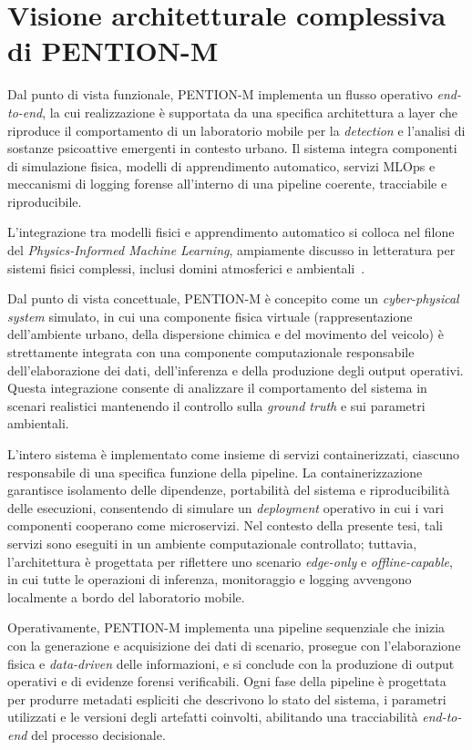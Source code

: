 \section{Visione architetturale complessiva di \textsc{PENTION-M}}
\label{sec:arch_overview}

Dal punto di vista funzionale, \textsc{PENTION-M} implementa un flusso operativo \textit{end-to-end}, la cui realizzazione è supportata da una specifica architettura a layer che riproduce il comportamento di un laboratorio mobile per la \textit{detection} e l’analisi di sostanze psicoattive emergenti in contesto urbano.
Il sistema integra componenti di simulazione fisica, modelli di apprendimento automatico, servizi MLOps e meccanismi di logging forense all’interno di una pipeline coerente, tracciabile e riproducibile.

L’integrazione tra modelli fisici e apprendimento automatico si colloca nel filone del \emph{Physics-Informed Machine Learning}, ampiamente discusso in letteratura per sistemi fisici complessi, inclusi domini atmosferici e ambientali~\cite{kashinath2021piml}.

Dal punto di vista concettuale, \textsc{PENTION-M} è concepito come un \emph{cyber-physical system} simulato, in cui una componente fisica virtuale (rappresentazione dell’ambiente urbano, della dispersione chimica e del movimento del veicolo) è strettamente integrata con una componente computazionale responsabile dell’elaborazione dei dati, dell’inferenza e della produzione degli output operativi.
Questa integrazione consente di analizzare il comportamento del sistema in scenari realistici mantenendo il controllo sulla \emph{ground truth} e sui parametri ambientali.

L’intero sistema è implementato come insieme di servizi containerizzati, ciascuno responsabile di una specifica funzione della pipeline.
La containerizzazione~\cite{merkel2014docker} garantisce isolamento delle dipendenze, portabilità del sistema e riproducibilità delle esecuzioni, consentendo di simulare un \textit{deployment} operativo in cui i vari componenti cooperano come microservizi.
Nel contesto della presente tesi, tali servizi sono eseguiti in un ambiente computazionale controllato; tuttavia, l’architettura è progettata per riflettere uno scenario \emph{edge-only} e \emph{offline-capable}, in cui tutte le operazioni di inferenza, monitoraggio e logging avvengono localmente a bordo del laboratorio mobile.

Operativamente, \textsc{PENTION-M} implementa una pipeline sequenziale che inizia con la generazione e acquisizione dei dati di scenario, prosegue con l’elaborazione fisica e \textit{data-driven} delle informazioni, e si conclude con la produzione di output operativi e di evidenze forensi verificabili.
Ogni fase della pipeline è progettata per produrre metadati espliciti che descrivono lo stato del sistema, i parametri utilizzati e le versioni degli artefatti coinvolti, abilitando una tracciabilità \textit{end-to-end} del processo decisionale.

